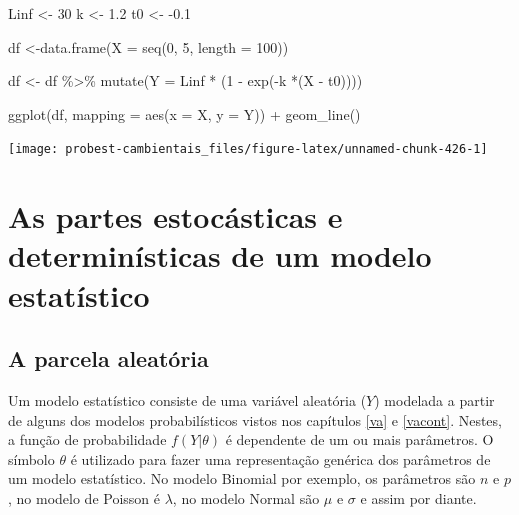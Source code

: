 \documentclass[
]{book}
\newenvironment{Shaded}{\begin{snugshade}}{\end{snugshade}}
\newcommand{\AttributeTok}[1]{\textcolor[rgb]{0.77,0.63,0.00}{#1}}
\newcommand{\DecValTok}[1]{\textcolor[rgb]{0.00,0.00,0.81}{#1}}
\newcommand{\FloatTok}[1]{\textcolor[rgb]{0.00,0.00,0.81}{#1}}
\newcommand{\FunctionTok}[1]{\textcolor[rgb]{0.00,0.00,0.00}{#1}}
\newcommand{\NormalTok}[1]{#1}
\newcommand{\OtherTok}[1]{\textcolor[rgb]{0.56,0.35,0.01}{#1}}
\newcommand{\SpecialCharTok}[1]{\textcolor[rgb]{0.00,0.00,0.00}{#1}}
\begin{document}
\begin{Shaded}
\begin{Highlighting}[]
\NormalTok{Linf }\OtherTok{\textless{}{-}} \DecValTok{30}
\NormalTok{k }\OtherTok{\textless{}{-}} \FloatTok{1.2}
\NormalTok{t0 }\OtherTok{\textless{}{-}} \SpecialCharTok{{-}}\FloatTok{0.1}

\NormalTok{df }\OtherTok{\textless{}{-}}\FunctionTok{data.frame}\NormalTok{(}\AttributeTok{X =} \FunctionTok{seq}\NormalTok{(}\DecValTok{0}\NormalTok{, }\DecValTok{5}\NormalTok{, }\AttributeTok{length =} \DecValTok{100}\NormalTok{))}

\NormalTok{df }\OtherTok{\textless{}{-}}\NormalTok{ df }\SpecialCharTok{\%\textgreater{}\%} \FunctionTok{mutate}\NormalTok{(}\AttributeTok{Y =}\NormalTok{ Linf }\SpecialCharTok{*}\NormalTok{ (}\DecValTok{1} \SpecialCharTok{{-}} \FunctionTok{exp}\NormalTok{(}\SpecialCharTok{{-}}\NormalTok{k }\SpecialCharTok{*}\NormalTok{(X }\SpecialCharTok{{-}}\NormalTok{ t0))))}

\FunctionTok{ggplot}\NormalTok{(df, }\AttributeTok{mapping =} \FunctionTok{aes}\NormalTok{(}\AttributeTok{x =}\NormalTok{ X, }\AttributeTok{y =}\NormalTok{ Y)) }\SpecialCharTok{+}
  \FunctionTok{geom\_line}\NormalTok{()}
\end{Highlighting}
\end{Shaded}

\begin{center}\texttt{[image: probest-cambientais\_files/figure-latex/unnamed-chunk-426-1]} \end{center}

\hypertarget{modelstat}{%
\chapter{As partes estocásticas e determinísticas de um modelo estatístico}\label{modelstat}}

\hypertarget{a-parcela-aleatuxf3ria}{%
\section{A parcela aleatória}\label{a-parcela-aleatuxf3ria}}

Um modelo estatístico consiste de uma variável aleatória (\(Y\)) modelada a partir de alguns dos modelos probabilísticos vistos nos capítulos \ref{va} e \ref{vacont}. Nestes, a função de probabilidade \(f(Y|\theta)\) é dependente de um ou mais parâmetros. O símbolo \(\theta\) é utilizado para fazer uma representação genérica dos parâmetros de um modelo estatístico. No modelo Binomial por exemplo, os parâmetros são \(n\) e \(p\), no modelo de Poisson é \(\lambda\), no modelo Normal são \(\mu\) e \(\sigma\) e assim por diante.
\end{document}
